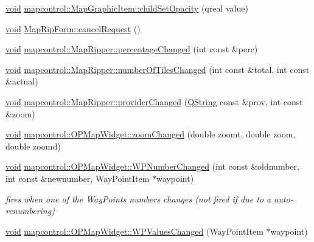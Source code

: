 \begin{DoxyCompactItemize}
\hyperlink{group___u_a_v_objects_plugin_ga444cf2ff3f0ecbe028adce838d373f5c}{void} \hyperlink{group___o_p_map_widget_ga2e3c45d4bbf9d439e3e6bb83d138c340}{mapcontrol\-::\-Map\-Graphic\-Item\-::child\-Set\-Opacity} (qreal value)
\item 
\hyperlink{group___u_a_v_objects_plugin_ga444cf2ff3f0ecbe028adce838d373f5c}{void} \hyperlink{group___o_p_map_widget_gada316d63680a0cc029958b0d0eb33f4a}{\-Map\-Rip\-Form\-::cancel\-Request} ()
\item 
\hyperlink{group___u_a_v_objects_plugin_ga444cf2ff3f0ecbe028adce838d373f5c}{void} \hyperlink{group___o_p_map_widget_ga49c16d8dabea46c8afafb51521e2428b}{mapcontrol\-::\-Map\-Ripper\-::percentage\-Changed} (int const \&perc)
\item 
\hyperlink{group___u_a_v_objects_plugin_ga444cf2ff3f0ecbe028adce838d373f5c}{void} \hyperlink{group___o_p_map_widget_ga5e1cd3587aa324cbf448b05771ef51c8}{mapcontrol\-::\-Map\-Ripper\-::number\-Of\-Tiles\-Changed} (int const \&total, int const \&actual)
\item 
\hyperlink{group___u_a_v_objects_plugin_ga444cf2ff3f0ecbe028adce838d373f5c}{void} \hyperlink{group___o_p_map_widget_ga19cc407500250e1c43e975e30ea90112}{mapcontrol\-::\-Map\-Ripper\-::provider\-Changed} (\hyperlink{group___u_a_v_objects_plugin_gab9d252f49c333c94a72f97ce3105a32d}{\-Q\-String} const \&prov, int const \&zoom)
\item 
\hyperlink{group___u_a_v_objects_plugin_ga444cf2ff3f0ecbe028adce838d373f5c}{void} \hyperlink{group___o_p_map_widget_ga5f82149d3970603013155e5ace73c085}{mapcontrol\-::\-O\-P\-Map\-Widget\-::zoom\-Changed} (double zoomt, double zoom, double zoomd)
\item 
\hyperlink{group___u_a_v_objects_plugin_ga444cf2ff3f0ecbe028adce838d373f5c}{void} \hyperlink{group___o_p_map_widget_gad5aa3c5dba212fe3975e483da178f16c}{mapcontrol\-::\-O\-P\-Map\-Widget\-::\-W\-P\-Number\-Changed} (int const \&oldnumber, int const \&newnumber, \-Way\-Point\-Item $\ast$waypoint)
\begin{DoxyCompactList}\small\item\em fires when one of the \-Way\-Points numbers changes (not fired if due to a auto-\/renumbering) \end{DoxyCompactList}\item 
\hyperlink{group___u_a_v_objects_plugin_ga444cf2ff3f0ecbe028adce838d373f5c}{void} \hyperlink{group___o_p_map_widget_ga7b05d6d31a9d3dc1fb1bf4d581884f77}{mapcontrol\-::\-O\-P\-Map\-Widget\-::\-W\-P\-Values\-Changed} (\-Way\-Point\-Item $\ast$waypoint)

\end{DoxyCompactItemize}
